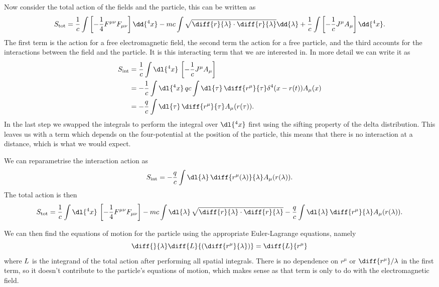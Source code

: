 Now consider the total action of the fields and the particle, this can be written as
\begin{equation*}
    S_{\text{tot}} = \frac{1}{c}\int \left[ -\frac{1}{4}F^{\mu\nu}F_{\mu\nu} \right] \dd{^4x} - mc \int \sqrt{\diff{r}{\lambda} \cdot \diff{r}{\lambda}} \dd{\lambda} + \frac{1}{c} \int \left[ -\frac{1}{c}J^\mu A_\mu \right] \dd{^4x}.
\end{equation*}
The first term is the action for a free electromagnetic field, the second term the action for a free particle, and the third accounts for the interactions between the field and the particle.
It is this interacting term that we are interested in.
In more detail we can write it as
\begin{align}
    S_{\text{int}} &= \frac{1}{c}\int \dl{^4x} \, \left[ -\frac{1}{c}J^\mu A_\mu \right]\\
    &= -\frac{1}{c} \int \dl{^4x} \, qc \int \dl{\tau} \, \diff{r^\mu}{\tau} \delta^4(x - r(t)) A_\mu(x)\\
    &= -\frac{q}{c} \int \dl{\tau} \, \diff{r^\mu}{\tau} A_\mu(r(\tau)).
\end{align}
In the last step we swapped the integrals to perform the integral over \(\dl{^4x}\) first using the sifting property of the delta distribution.
This leaves us with a term which depends on the four-potential at the position of the particle, this means that there is no interaction at a distance, which is what we would expect.

We can reparametrise the interaction action as
\begin{equation}
    S_{\text{int}} = -\frac{q}{c} \int \dl{\lambda} \, \diff{r^\mu(\lambda)}{\lambda} A_\mu(r(\lambda)).
\end{equation}
The total action is then
\begin{equation}
    S_{\text{tot}} = \frac{1}{c}\int \dl{^4x}\, \left[ -\frac{1}{4}F^{\mu\nu}F_{\mu\nu} \right] -mc \int \dl{\lambda} \, \sqrt{\diff{r}{\lambda} \cdot \diff{r}{\lambda}} - \frac{q}{c} \int \dl{\lambda} \, \diff{r^\mu}{\lambda} A_\mu(r(\lambda)).
\end{equation}

We can then find the equations of motion for the particle using the appropriate Euler-Lagrange equations, namely
\begin{equation}
    \diff{}{\lambda} \diff{\lagrangian}{\left( \diff{r^\mu}{\lambda} \right)} = \diff{\lagrangian}{r^\mu}
\end{equation}
where \(L\) is the integrand of the total action after performing all spatial integrals.
There is no dependence on \(r^\mu\) or \(\diff{r^\mu}/{\lambda}\) in the first term, so it doesn't contribute to the particle's equations of motion, which makes sense as that term is only to do with the electromagnetic field.

